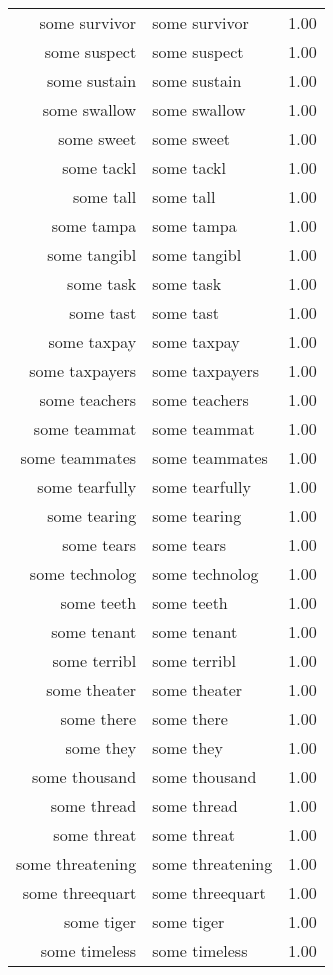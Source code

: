 \begin{table}[ht]
\begin{tabular}{rlr}
  some survivor & some survivor & 1.00 \\ 
  some suspect & some suspect & 1.00 \\ 
  some sustain & some sustain & 1.00 \\ 
  some swallow & some swallow & 1.00 \\ 
  some sweet & some sweet & 1.00 \\ 
  some tackl & some tackl & 1.00 \\ 
  some tall & some tall & 1.00 \\ 
  some tampa & some tampa & 1.00 \\ 
  some tangibl & some tangibl & 1.00 \\ 
  some task & some task & 1.00 \\ 
  some tast & some tast & 1.00 \\ 
  some taxpay & some taxpay & 1.00 \\ 
  some taxpayers & some taxpayers & 1.00 \\ 
  some teachers & some teachers & 1.00 \\ 
  some teammat & some teammat & 1.00 \\ 
  some teammates & some teammates & 1.00 \\ 
  some tearfully & some tearfully & 1.00 \\ 
  some tearing & some tearing & 1.00 \\ 
  some tears & some tears & 1.00 \\ 
  some technolog & some technolog & 1.00 \\ 
  some teeth & some teeth & 1.00 \\ 
  some tenant & some tenant & 1.00 \\ 
  some terribl & some terribl & 1.00 \\ 
  some theater & some theater & 1.00 \\ 
  some there & some there & 1.00 \\ 
  some they & some they & 1.00 \\ 
  some thousand & some thousand & 1.00 \\ 
  some thread & some thread & 1.00 \\ 
  some threat & some threat & 1.00 \\ 
  some threatening & some threatening & 1.00 \\ 
  some threequart & some threequart & 1.00 \\ 
  some tiger & some tiger & 1.00 \\ 
  some timeless & some timeless & 1.00 \\ 

\end{tabular}
\end{table}
